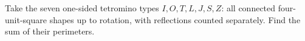 Take the seven one-sided tetromino types $I,O,T,L,J,S,Z$: all connected four-unit-square shapes up to rotation, with reflections counted separately. Find the sum of their perimeters.
